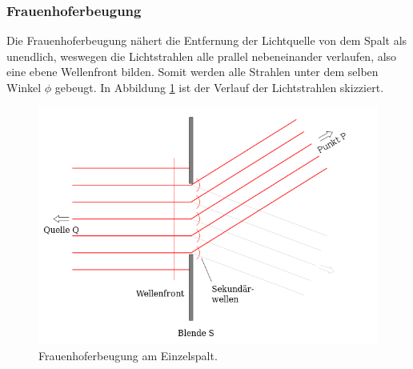 \subsubsection*{Frauenhoferbeugung}
Die Frauenhoferbeugung nähert die Entfernung der Lichtquelle von dem Spalt als unendlich, weswegen die Lichtstrahlen alle prallel nebeneinander verlaufen, also 
eine ebene Wellenfront bilden. Somit werden alle Strahlen unter dem selben Winkel $\phi$ gebeugt. In Abbildung \ref{fig:frauenhofer} ist der Verlauf der 
Lichtstrahlen skizziert.
\begin{figure}[H]
    \centering
    \includegraphics[scale = 0.45]{pictures/frauenhofer.png}
    \caption{Frauenhoferbeugung am Einzelspalt. \cite{AP02}}
    \label{fig:frauenhofer}
\end{figure}
\noindent

